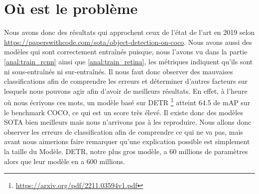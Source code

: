 \section{Où est le problème}\label{ch:eval:sex:problem}

Nous avons donc des résultats qui approchent ceux de l'état de l'art en 2019 selon \url{https://paperswithcode.com/sota/object-detection-on-coco}. Nous avons aussi des modèles qui sont correctement entraînés puisque, nous l'avons vu dans la partie \ref{anal:train_rcnn} ainsi que \ref{anal:train_retina}, les métriques indiquent qu'ils sont ni sous-entraînés ni sur-entraînés. Il nous faut donc observer des mauvaises classifications afin de comprendre les erreurs et déterminer d'autres facteurs sur lesquels nous pouvons agir afin d'avoir de meilleurs résultats. En effet, à l'heure où nous écrivons ces mots, un modèle basé sur DETR \footnote[1]{\url{https://arxiv.org/pdf/2211.03594v1.pdf}} atteint 64.5 de mAP sur le benchmark COCO, ce qui est un score très élevé. Il existe donc des modèles SOTA bien meilleurs mais nous n'arrivons pas à les reproduire. Nous allons donc observer les erreurs de classification afin de comprendre ce qui ne va pas, mais avant nous aimerions faire remarquer qu'une explication possible est simplement la taille du Modèle. DETR, notre plus gros modèle, a 60 millions de paramètres alors que leur modèle en a 600 millions.
